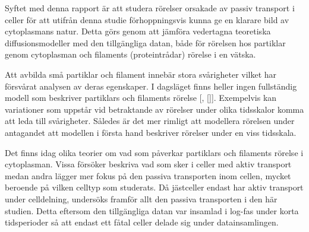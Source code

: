 Syftet med denna rapport är att studera rörelser orsakade av passiv transport i celler för att utifrån denna studie förhoppningsvis kunna ge en klarare bild av cytoplasmans natur. Detta görs genom att jämföra vedertagna teoretiska diffusionsmodeller med den tillgängliga datan, både för rörelsen hos partiklar genom cytoplasman och filaments (proteintrådar) rörelse i en vätska. %


Att avbilda små partiklar och filament innebär stora svårigheter vilket har försvårat analysen av deras egenskaper. I dagsläget finns heller ingen fullständig modell som beskriver partiklars och filaments rörelse [\cite{Hofling&Franosch2013}, []]. %
Exempelvis kan variationer som uppstår vid betraktande av rörelser under olika tidsskalor komma att leda till svårigheter. %
Således är det mer rimligt att modellera rörelsen under antagandet att modellen i första hand beskriver rörelser under en viss tidsskala.%

Det finns idag olika teorier om vad som påverkar partiklars och filaments rörelse i cytoplasman. Vissa \cite{Gou_etal2014} försöker beskriva vad som sker i celler med aktiv transport medan andra \cite{Parry_etal2014} lägger mer fokus på den passiva transporten inom cellen, mycket beroende på vilken celltyp som studerats. Då jästceller endast har aktiv transport under celldelning, undersöks framför allt den passiva transporten i den här studien. Detta eftersom den tillgängliga datan var insamlad i log-fas under korta tidsperioder så att endast ett fåtal celler delade sig under datainsamlingen. 








